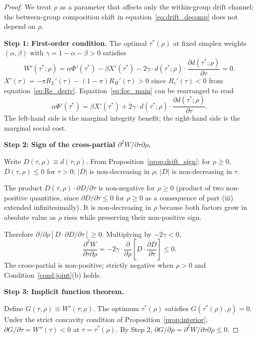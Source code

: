 \begin{proof}
We treat $\rho$ as a parameter that affects only the within-group drift channel; the between-group composition shift in equation~\eqref{eq:drift_decomp} does not depend on $\rho$.

\textbf{Step 1: First-order condition.} The optimal $\tau^*(\rho)$ at fixed simplex weights $(\alpha, \beta)$ with $\gamma = 1 - \alpha - \beta > 0$ satisfies
\begin{equation}
W'(\tau^*; \rho) = \alpha \Phi'(\tau^*) - \beta X'(\tau^*) - 2 \gamma \cdot d(\tau^*; \rho) \cdot \frac{\partial d(\tau^*; \rho)}{\partial \tau} = 0.
\label{eq:foc_main}
\end{equation}
$X'(\tau) = -\pi R_L'(\tau) - (1-\pi) R_H'(\tau) > 0$ since $R_e'(\tau) < 0$ from equation~\eqref{eq:Re_deriv}. Equation~\eqref{eq:foc_main} can be rearranged to read
\[
\alpha \Phi'(\tau^*) = \beta X'(\tau^*) + 2 \gamma \cdot d(\tau^*; \rho) \cdot \frac{\partial d(\tau^*; \rho)}{\partial \tau}.
\]
The left-hand side is the marginal integrity benefit; the right-hand side is the marginal social cost.

\textbf{Step 2: Sign of the cross-partial $\partial^2 W/\partial \tau \partial \rho$.}

Write $D(\tau, \rho) \equiv d(\tau; \rho)$. From Proposition~\ref{prop:drift_sign}: for $\rho \geq 0$, $D(\tau, \rho) \leq 0$ for $\tau > 0$; $|D|$ is non-decreasing in $\rho$; $|D|$ is non-decreasing in $\tau$.

The product $D(\tau, \rho) \cdot \partial D/\partial \tau$ is non-negative for $\rho \geq 0$ (product of two non-positive quantities, since $\partial D/\partial \tau \leq 0$ for $\rho \geq 0$ as a consequence of part (iii) extended infinitesimally). It is non-decreasing in $\rho$ because both factors grow in absolute value as $\rho$ rises while preserving their non-positive sign.

Therefore $\partial / \partial \rho [D \cdot \partial D / \partial \tau] \geq 0$. Multiplying by $-2\gamma < 0$,
\[
\frac{\partial^2 W}{\partial \tau \partial \rho} = -2\gamma \cdot \frac{\partial}{\partial \rho}\!\left[ D \cdot \frac{\partial D}{\partial \tau} \right] \leq 0.
\]
The cross-partial is non-positive; strictly negative when $\rho > 0$ and Condition~\ref{cond:joint}(b) holds.

\textbf{Step 3: Implicit function theorem.}

Define $G(\tau, \rho) \equiv W'(\tau; \rho)$. The optimum $\tau^*(\rho)$ satisfies $G(\tau^*(\rho), \rho) = 0$. Under the strict concavity condition of Proposition~\ref{prop:interior}, $\partial G/\partial \tau = W''(\tau) < 0$ at $\tau = \tau^*(\rho)$. By Step 2, $\partial G/\partial \rho = \partial^2 W/\partial \tau \partial \rho \leq 0$.


\end{proof}
